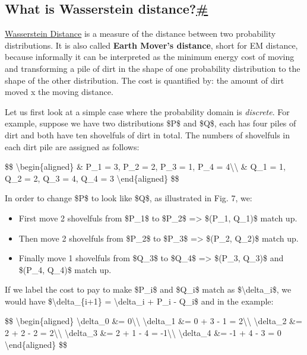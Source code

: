 \subsection{\texorpdfstring{What is Wasserstein distance?\hyperref[what-is-wasserstein-distance]{\#}}{What is Wasserstein distance?\#}}\label{what-is-wasserstein-distance}

\href{https://en.wikipedia.org/wiki/Wasserstein_metric}{Wasserstein Distance} is a measure of the distance between two probability distributions. It is also called \textbf{Earth Mover's distance}, short for EM distance, because informally it can be interpreted as the minimum energy cost of moving and transforming a pile of dirt in the shape of one probability distribution to the shape of the other distribution. The cost is quantified by: the amount of dirt moved x the moving distance.

Let us first look at a simple case where the probability domain is \emph{discrete}. For example, suppose we have two distributions \$P\$ and \$Q\$, each has four piles of dirt and both have ten shovelfuls of dirt in total. The numbers of shovelfuls in each dirt pile are assigned as follows:

\$\$ \textbackslash begin\{aligned\} \& P\_1 = 3, P\_2 = 2, P\_3 = 1, P\_4 = 4\textbackslash\textbackslash{} \& Q\_1 = 1, Q\_2 = 2, Q\_3 = 4, Q\_4 = 3 \textbackslash end\{aligned\} \$\$

In order to change \$P\$ to look like \$Q\$, as illustrated in Fig. 7, we:

\begin{itemize}
\tightlist
\item
  First move 2 shovelfuls from \$P\_1\$ to \$P\_2\$ =\textgreater{} \$(P\_1, Q\_1)\$ match up.
\item
  Then move 2 shovelfuls from \$P\_2\$ to \$P\_3\$ =\textgreater{} \$(P\_2, Q\_2)\$ match up.
\item
  Finally move 1 shovelfuls from \$Q\_3\$ to \$Q\_4\$ =\textgreater{} \$(P\_3, Q\_3)\$ and \$(P\_4, Q\_4)\$ match up.
\end{itemize}

If we label the cost to pay to make \$P\_i\$ and \$Q\_i\$ match as \$\textbackslash delta\_i\$, we would have \$\textbackslash delta\_\{i+1\} = \textbackslash delta\_i + P\_i - Q\_i\$ and in the example:

\$\$ \textbackslash begin\{aligned\} \textbackslash delta\_0 \&= 0\textbackslash\textbackslash{} \textbackslash delta\_1 \&= 0 + 3 - 1 = 2\textbackslash\textbackslash{} \textbackslash delta\_2 \&= 2 + 2 - 2 = 2\textbackslash\textbackslash{} \textbackslash delta\_3 \&= 2 + 1 - 4 = -1\textbackslash\textbackslash{} \textbackslash delta\_4 \&= -1 + 4 - 3 = 0 \textbackslash end\{aligned\} \$\$

